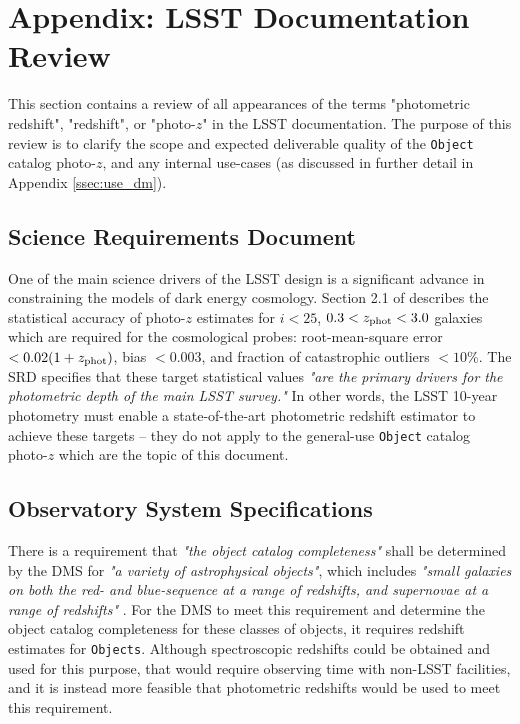 \documentclass[DM,lsstdraft,toc]{lsstdoc}
\begin{document}
\clearpage
\section{Appendix: LSST Documentation Review}\label{sec:docs}

This section contains a review of all appearances of the terms "photometric redshift", "redshift", or "photo-$z$" in the LSST documentation.
The purpose of this review is to clarify the scope and expected deliverable quality of the {\tt Object} catalog photo-$z$, and any internal use-cases (as discussed in further detail in Appendix \ref{ssec:use_dm}).

\subsection{Science Requirements Document}\label{ssec:docs_srd}

One of the main science drivers of the LSST design is a significant advance in constraining the models of dark energy cosmology. 
Section 2.1 of  describes the statistical accuracy of photo-$z$ estimates for $i<25$, $0.3<z_{\rm phot}<3.0$ galaxies which are required for the cosmological probes: root-mean-square error $<0.02(1+z_{\rm phot})$, bias $<0.003$, and fraction of catastrophic outliers $<10\%$.
The SRD specifies that these target statistical values {\it "are the primary drivers for the photometric depth of the main LSST survey."} 
In other words, the LSST 10-year photometry must enable a state-of-the-art photometric redshift estimator to achieve these targets -- they do not apply to the general-use {\tt Object} catalog photo-$z$ which are the topic of this document.

\subsection{Observatory System Specifications}\label{ssec:docs_oss}

There is a requirement that {\it "the object catalog completeness"} shall be determined by the DMS for {\it "a variety of astrophysical objects"}, which includes {\it "small galaxies on both the red- and blue-sequence at a range of redshifts, and supernovae at a range of redshifts"} . 
For the DMS to meet this requirement and determine the object catalog completeness for these classes of objects, it requires redshift estimates for {\tt Objects}.
Although spectroscopic redshifts could be obtained and used for this purpose, that would require observing time with non-LSST facilities, and it is instead more feasible that photometric redshifts would be used to meet this requirement.
\end{document}
